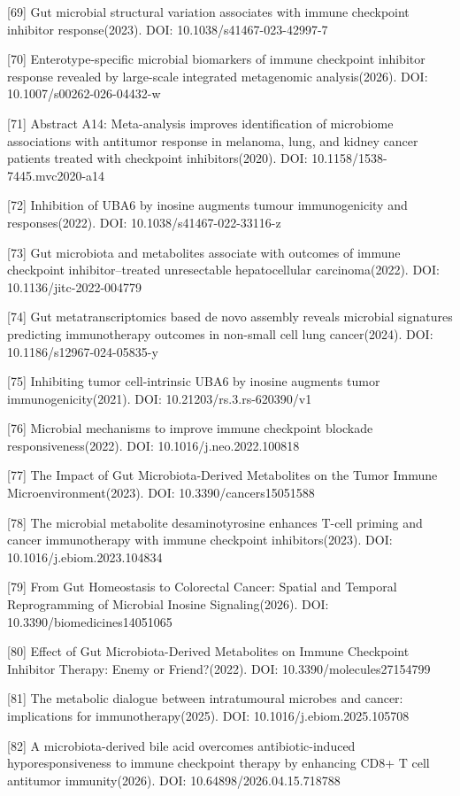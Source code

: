 {[}69{]} Gut microbial structural variation associates with immune checkpoint inhibitor response(2023). DOI: 10.1038/s41467-023-42997-7

{[}70{]} Enterotype-specific microbial biomarkers of immune checkpoint inhibitor response revealed by large-scale integrated metagenomic analysis(2026). DOI: 10.1007/s00262-026-04432-w

{[}71{]} Abstract A14: Meta-analysis improves identification of microbiome associations with antitumor response in melanoma, lung, and kidney cancer patients treated with checkpoint inhibitors(2020). DOI: 10.1158/1538-7445.mvc2020-a14

{[}72{]} Inhibition of UBA6 by inosine augments tumour immunogenicity and responses(2022). DOI: 10.1038/s41467-022-33116-z

{[}73{]} Gut microbiota and metabolites associate with outcomes of immune checkpoint inhibitor--treated unresectable hepatocellular carcinoma(2022). DOI: 10.1136/jitc-2022-004779

{[}74{]} Gut metatranscriptomics based de novo assembly reveals microbial signatures predicting immunotherapy outcomes in non-small cell lung cancer(2024). DOI: 10.1186/s12967-024-05835-y

{[}75{]} Inhibiting tumor cell-intrinsic UBA6 by inosine augments tumor immunogenicity(2021). DOI: 10.21203/rs.3.rs-620390/v1

{[}76{]} Microbial mechanisms to improve immune checkpoint blockade responsiveness(2022). DOI: 10.1016/j.neo.2022.100818

{[}77{]} The Impact of Gut Microbiota-Derived Metabolites on the Tumor Immune Microenvironment(2023). DOI: 10.3390/cancers15051588

{[}78{]} The microbial metabolite desaminotyrosine enhances T-cell priming and cancer immunotherapy with immune checkpoint inhibitors(2023). DOI: 10.1016/j.ebiom.2023.104834

{[}79{]} From Gut Homeostasis to Colorectal Cancer: Spatial and Temporal Reprogramming of Microbial Inosine Signaling(2026). DOI: 10.3390/biomedicines14051065

{[}80{]} Effect of Gut Microbiota-Derived Metabolites on Immune Checkpoint Inhibitor Therapy: Enemy or Friend?(2022). DOI: 10.3390/molecules27154799

{[}81{]} The metabolic dialogue between intratumoural microbes and cancer: implications for immunotherapy(2025). DOI: 10.1016/j.ebiom.2025.105708

{[}82{]} A microbiota-derived bile acid overcomes antibiotic-induced hyporesponsiveness to immune checkpoint therapy by enhancing CD8+ T cell antitumor immunity(2026). DOI: 10.64898/2026.04.15.718788

